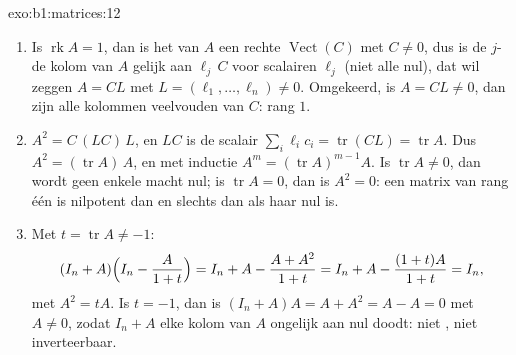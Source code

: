 \begin{solution}{exo:b1:matrices:12}
\begin{enumerate}
  \item Is $\operatorname{rk} A = 1$, dan is het  van $A$ een
        rechte $\operatorname{Vect}(C)$ met $C \neq 0$, dus is de
        $j$-de kolom van $A$ gelijk aan $\ell_j\,C$ voor scalairen
        $\ell_j$ (niet alle nul), dat wil zeggen $A = C L$ met $L =
        (\ell_1, \dots, \ell_n) \neq 0$. Omgekeerd, is $A = CL \neq
        0$, dan zijn alle kolommen veelvouden van $C$: rang $1$.
  \item $A^2 = C\,(L C)\,L$, en $LC$ is de scalair $\sum_i \ell_i
        c_i = \operatorname{tr}(CL) = \operatorname{tr} A$. Dus $A^2
        = (\operatorname{tr} A)\,A$, en met inductie $A^m =
        (\operatorname{tr} A)^{m-1} A$. Is $\operatorname{tr} A \neq
        0$, dan wordt geen enkele macht nul; is $\operatorname{tr} A
        = 0$, dan is $A^2 = 0$: een matrix van rang één is nilpotent
        dan en slechts dan als haar  nul is.
  \item Met $t = \operatorname{tr} A \neq -1$:
        \[
        (I_n + A)\Bigl(I_n - \frac{A}{1 + t}\Bigr)
        = I_n + A - \frac{A + A^2}{1 + t}
        = I_n + A - \frac{(1 + t)A}{1 + t} = I_n ,
        \]
        met $A^2 = tA$. Is $t = -1$, dan is $(I_n + A)A = A + A^2 =
        A - A = 0$ met $A \neq 0$, zodat $I_n + A$ elke kolom van
        $A$ ongelijk aan nul doodt: niet , niet
        inverteerbaar.
\end{enumerate}
\end{solution}

